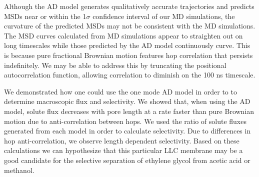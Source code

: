 \documentclass[aps,pre,preprint,groupedaddress]{revtex4-2}
\begin{document}
  Although the AD model generates qualitatively accurate trajectories and 
  predicts MSDs near or within the 1$\sigma$ confidence interval of our
  MD simulations, the curvature of the predicted MSDs 
  may not be consistent
  with the MD simulations. The MSD curves calculated from MD simulations 
  appear to straighten out on long timescales while those predicted by the
  AD model continuously curve. This is because pure fractional Brownian motion
  features hop correlation that persists indefinitely. We may be able to address
  this by truncating the positional autocorrelation function, allowing 
  correlation to diminish on the 100 ns timescale. 

  We demonstrated how one could use the one mode AD model in order to to determine
  macroscopic flux and selectivity. We showed that, when using the AD model, 
  solute flux decreases with pore length at a rate faster than pure 
  Brownian motion due to anti-correlation between hops. We used the ratio of 
  solute fluxes generated from each model in order to calculate selectivity. 
  Due to differences in hop anti-correlation, we observe length dependent 
  selectivity. Based on these calculations we can hypothesize that this 
  particular LLC membrane may be a good candidate for the selective separation
  of ethylene glycol from acetic acid or methanol.
  
  
\end{document}
